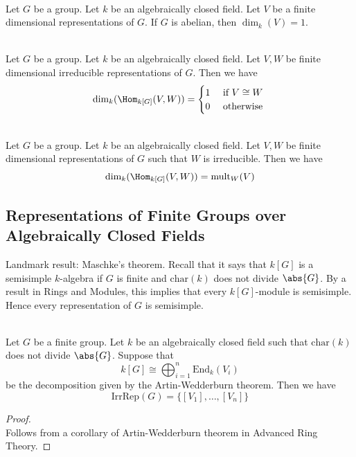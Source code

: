 \documentclass[a4paper]{article}
\begin{document}
\begin{crl}{}{}\\
Let $G$ be a group. Let $k$ be an algebraically closed field. Let $V$ be a finite dimensional representations of $G$. If $G$ is abelian, then $\dim_k(V)=1$. 
\end{crl}

\begin{crl}{}{}\\
Let $G$ be a group. Let $k$ be an algebraically closed field. Let $V,W$ be finite dimensional irreducible representations of $G$. Then we have $$\dim_k(\Hom_{k[G]}(V,W))=\begin{cases}
1 & \text{ if }V\cong W\\
0 & \text{ otherwise }
\end{cases}$$
\end{crl}

\begin{crl}{}{}\\
Let $G$ be a group. Let $k$ be an algebraically closed field. Let $V,W$ be finite dimensional representations of $G$ such that $W$ is irreducible. Then we have $$\dim_k(\Hom_{k[G]}(V,W))=\text{mult}_W(V)$$
\end{crl}

\subsection{Representations of Finite Groups over Algebraically Closed Fields}
Landmark result: Maschke's theorem. Recall that it says that $k[G]$ is a semisimple $k$-algebra if $G$ is finite and $\text{char}(k)$ does not divide $\abs{G}$. By a result in Rings and Modules, this implies that every $k[G]$-module is semisimple. Hence every representation of $G$ is semisimple. \\

\begin{prp}{}{}\\
Let $G$ be a finite group. Let $k$ be an algebraically closed field such that $\text{char}(k)$ does not divide $\abs{G}$. Suppose that $$k[G]\cong\bigoplus_{i=1}^n\text{End}_k(V_i)$$ be the decomposition given by the Artin-Wedderburn theorem. Then we have $$\text{IrrRep}(G)=\{[V_1],\dots,[V_n]\}$$
\begin{proof}\\
Follows from a corollary of Artin-Wedderburn theorem in Advanced Ring Theory. 
\end{proof}
\end{prp}
\end{document}

